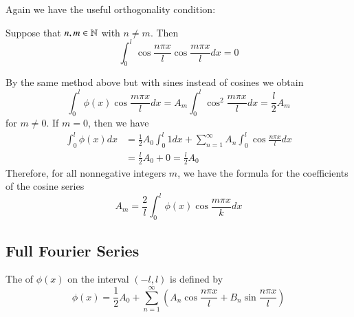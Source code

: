 \documentclass[12pt, a4paper, oneside, openright, titlepage]{book}
\begin{document}
Again we have the useful orthogonality condition: 

\begin{prop}
    Suppose that $n,m \in \mathbb N$ with $n \neq m$. Then \begin{equation}
        \int_0^l\cos\frac{n\pi x}{l}\cos\frac{m\pi x}{l}dx = 0
    \end{equation}
\end{prop}
By the same method above but with sines instead of cosines we obtain \begin{equation}
    \int_0^l\phi(x)\cos\frac{m\pi x}{l}dx = A_m\int_0^l\cos^2\frac{m\pi x}{l}dx = \frac{l}{2}A_m
\end{equation}
for $m \neq 0$. If $m = 0$, then we have \begin{align*}
    \int_0^l\phi(x)dx &= \frac{1}{2}A_0\int_0^l1dx + \sum_{n=1}^{\infty}A_n\int_0^l\cos\frac{n\pi x}{l}dx \\
    &= \frac{l}{2}A_0 + 0 = \frac{l}{2}A_0
\end{align*}
Therefore, for all nonnegative integers $m$, we have the formula for the coefficients of the cosine series \begin{equation}
    \boxed{A_m = \frac{2}{l}\int_0^l\phi(x)\cos\frac{m\pi x}{k}dx}
\end{equation}

\subsection{Full Fourier Series}

\begin{defn}
    The  of $\phi(x)$ on the interval $(-l,l)$ is defined by \begin{equation}
        \boxed{\phi(x) = \frac{1}{2}A_0+\sum_{n=1}^{\infty}\left(A_n\cos\frac{n\pi x}{l}+B_n\sin\frac{n\pi x}{l}\right)}
    \end{equation}
\end{defn}
\end{document}
